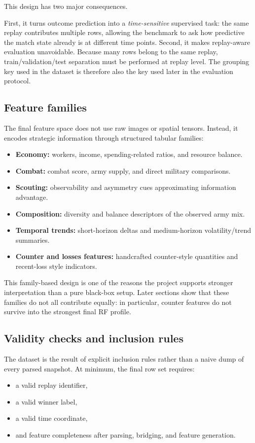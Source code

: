 \documentclass[11pt,a4paper]{article}
\begin{document}
This design has two major consequences.

First, it turns outcome prediction into a \emph{time-sensitive} supervised task: the same replay contributes multiple rows, allowing the benchmark to ask how predictive the match state already is at different time points. Second, it makes replay-aware evaluation unavoidable. Because many rows belong to the same replay, train/validation/test separation must be performed at replay level. The grouping key used in the dataset is therefore also the key used later in the evaluation protocol.

\subsection{Feature families}
The final feature space does not use raw images or spatial tensors. Instead, it encodes strategic information through structured tabular families:
\begin{itemize}
    \item \textbf{Economy:} workers, income, spending-related ratios, and resource balance.
    \item \textbf{Combat:} combat score, army supply, and direct military comparisons.
    \item \textbf{Scouting:} observability and asymmetry cues approximating information advantage.
    \item \textbf{Composition:} diversity and balance descriptors of the observed army mix.
    \item \textbf{Temporal trends:} short-horizon deltas and medium-horizon volatility/trend summaries.
    \item \textbf{Counter and losses features:} handcrafted counter-style quantities and recent-loss style indicators.
\end{itemize}

This family-based design is one of the reasons the project supports stronger interpretation than a pure black-box setup. Later sections show that these families do not all contribute equally: in particular, counter features do not survive into the strongest final RF profile.

\subsection{Validity checks and inclusion rules}
The dataset is the result of explicit inclusion rules rather than a naive dump of every parsed snapshot. At minimum, the final row set requires:
\begin{itemize}
    \item a valid replay identifier,
    \item a valid winner label,
    \item a valid time coordinate,
    \item and feature completeness after parsing, bridging, and feature generation.
\end{itemize}
\end{document}
